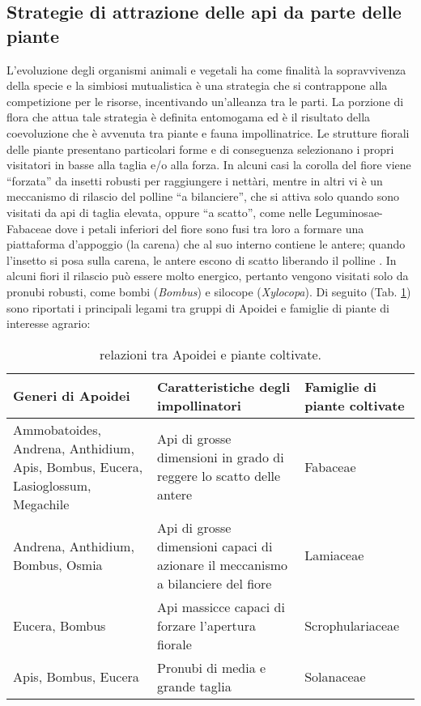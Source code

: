 \documentclass[main.tex]{subfiles}
\begin{document}
\subsection{Strategie di attrazione delle api da parte delle piante}

L’evoluzione degli organismi animali e vegetali ha come finalità la sopravvivenza della specie e la simbiosi mutualistica è una strategia che si contrappone alla competizione per le risorse, incentivando un’alleanza tra le parti. La porzione di flora che attua tale strategia è definita entomogama ed è il risultato della coevoluzione che è avvenuta tra piante e fauna impollinatrice.
Le strutture fiorali delle piante presentano particolari forme e di conseguenza selezionano i propri visitatori in basse alla taglia e/o alla forza. In alcuni casi la corolla del fiore viene “forzata” da insetti robusti per raggiungere i nettàri, mentre in altri vi è un meccanismo di rilascio del polline “a bilanciere”, che si attiva solo quando sono visitati da api di taglia elevata, oppure “a scatto”, come nelle Leguminosae-Fabaceae dove i petali inferiori del fiore sono fusi tra loro a formare una piattaforma d’appoggio (la carena) che al suo interno contiene le antere; quando l’insetto si posa sulla carena, le antere escono di scatto liberando il polline \citep{serin}. In alcuni fiori il rilascio può essere molto energico, pertanto vengono visitati solo da pronubi robusti, come bombi (\textit{Bombus}) e silocope (\textit{Xylocopa}).
Di seguito (Tab. \ref{tab:1}) sono riportati i principali legami tra gruppi di Apoidei e famiglie di piante di interesse agrario:\\

\begin{table}[h!]
    \centering
\begin{tabular}{|p{5cm}|p{5cm}|p{5cm}|}
\hline
Generi di Apoidei & Caratteristiche degli impollinatori & Famiglie di piante coltivate\\
\hline
Ammobatoides, Andrena, Anthidium, Apis, Bombus, Eucera, Lasioglossum, Megachile & Api di grosse dimensioni in grado di reggere lo scatto delle antere & Fabaceae\\
\hline
Andrena, Anthidium, Bombus, Osmia & Api di grosse dimensioni capaci di azionare il meccanismo a bilanciere del fiore & Lamiaceae\\
\hline
Eucera, Bombus & Api massicce capaci di forzare l’apertura fiorale & Scrophulariaceae\\
\hline
Apis, Bombus, Eucera & Pronubi di media e grande taglia & Solanaceae\\
\hline
\end{tabular}
    \caption{relazioni tra Apoidei e piante coltivate.}
    \label{tab:1}
\end{table}
\end{document}
